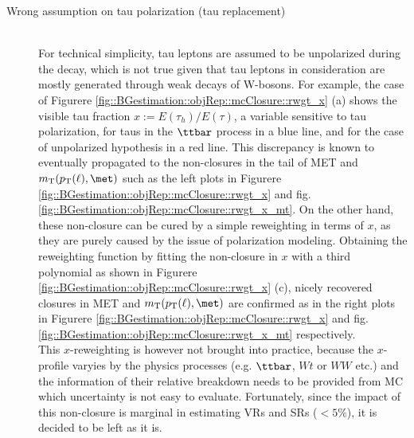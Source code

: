 \begin{description}
\item [Wrong assumption on tau polarization (tau replacement)] \mbox{} \\
For technical simplicity, tau leptons are assumed to be unpolarized during the decay, which is not true given that tau leptons in consideration are mostly generated through weak decays of W-bosons. For example, the case of Figurere \ref{fig::BGestimation::objRep::mcClosure::rwgt_x} (a) shows the visible tau fraction $x := E(\tau_{h})/E(\tau)$, a variable sensitive to tau polarization, for taus in the $\ttbar$ process in a blue line, and for the case of unpolarized hypothesis in a red line. This discrepancy is known to eventually propagated to the non-closures in the tail of MET and $\mtFull$ such as the left plots in Figurere \ref{fig::BGestimation::objRep::mcClosure::rwgt_x} and fig. \ref{fig::BGestimation::objRep::mcClosure::rwgt_x_mt}. On the other hand, these non-closure can be cured by a simple reweighting in terms of $x$, as they are purely caused by the issue of polarization modeling. Obtaining the reweighting function by fitting the non-closure in $x$ with a third polynomial as shown in Figurere \ref{fig::BGestimation::objRep::mcClosure::rwgt_x} (c), nicely recovered closures in MET and $\mtFull$ are confirmed as in the right plots in Figurere \ref{fig::BGestimation::objRep::mcClosure::rwgt_x} and fig. \ref{fig::BGestimation::objRep::mcClosure::rwgt_x_mt} respectively.  \\

This $x$-reweighting is however not brought into practice, because the $x$-profile varyies by the physics processes (e.g. $\ttbar$, $Wt$ or $WW$ etc.) and the information of their relative breakdown needs to be provided from MC which uncertainty is not easy to evaluate.
Fortunately, since the impact of this non-closure is marginal in estimating VRs and SRs ($<5\%$), it is decided to be left as it is.


\end{description}
